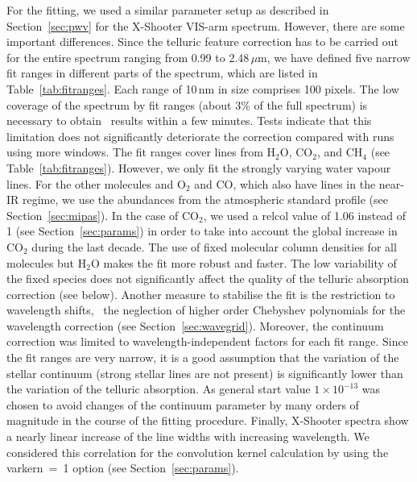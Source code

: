 For the fitting, we used a similar parameter setup as described in
Section~\ref{sec:pwv} for the X-Shooter VIS-arm spectrum. However, there are
some important differences. Since the telluric feature correction has to be
carried out for the entire spectrum ranging from 0.99 to 2.48\,$\mu$m, we have
defined five narrow fit ranges in different parts of the spectrum, which are
listed in Table~\ref{tab:fitranges}. Each range of 10\,nm in size comprises 100
pixels. The low coverage of the spectrum by fit ranges (about 3\% of the full
spectrum) is necessary to obtain \mf\ results within a few minutes. Tests
indicate that this limitation does not significantly deteriorate the correction
compared with runs using more windows. The fit ranges cover lines from H$_2$O,
CO$_2$, and CH$_4$ (see Table~\ref{tab:fitranges}). However, we only fit the
strongly varying water vapour lines. For the other molecules and O$_2$ and
CO, which also have lines in the near-IR regime, we use the abundances from
the atmospheric standard profile (see Section~\ref{sec:mipas}). In the case of
CO$_2$, we used a {\sc relcol} value of 1.06 instead of 1 (see
Section~\ref{sec:params}) in order to take into account the global increase in
CO$_2$ during the last decade. The use of fixed molecular column densities for
all molecules but H$_2$O makes the fit more robust and faster. The low
variability of the fixed species does not significantly affect the quality of
the telluric absorption correction (see below). Another measure to stabilise
the fit is the restriction to wavelength shifts, \ie\ the neglection of higher
order Chebyshev polynomials for the wavelength correction (see
Section~\ref{sec:wavegrid}). Moreover, the continuum correction was limited to
wavelength-independent factors for each fit range. Since the fit ranges are
very narrow, it is a good assumption that the variation of the stellar
continuum (strong stellar lines are not present) is significantly lower than
the variation of the telluric absorption. As general start value
$1 \times 10^{-13}$ was chosen to avoid changes of the continuum parameter by
many orders of magnitude in the course of the fitting procedure. Finally,
X-Shooter spectra show a nearly linear increase of the line widths with
increasing wavelength. We considered this correlation for the convolution
kernel calculation by using the {\sc varkern}~=~1 option (see
Section~\ref{sec:params}).

